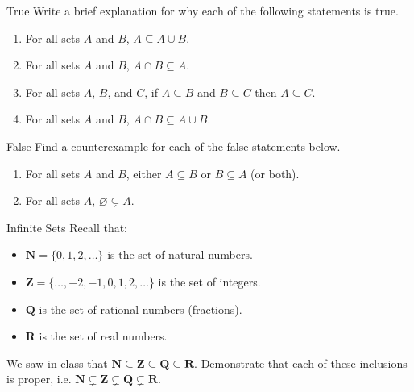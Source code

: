 \documentclass[12pt,letterpaper]{article}
\begin{document}
\begin{problem}{True}
  Write a brief explanation for why each of the following statements is true.

  \begin{enumerate}
    \item For all sets $A$ and $B$, $A \subseteq A \cup B$.
    \item For all sets $A$ and $B$, $A \cap B \subseteq A$.
    \item For all sets $A$, $B$, and $C$, if $A \subseteq B$ and $B \subseteq C$ then $A
    \subseteq C$.
    \item For all sets $A$ and $B$, $A \cap B \subseteq A \cup B$.
  \end{enumerate}
\end{problem}

\begin{problem}{False}
  Find a counterexample for each of the false statements below.

  \begin{enumerate}
    \item For all sets $A$ and $B$, either $A \subseteq B$ or $B \subseteq A$ (or both).
    \item For all sets $A$, $\varnothing \subsetneq A$. 
  \end{enumerate}
\end{problem}

\begin{problem}{Infinite Sets}
  Recall that:

  \begin{itemize}
    \item $\mathbf{N} = \{0, 1, 2, \dots\}$ is the set of natural numbers.
    \item $\mathbf{Z} = \{\dots, -2, -1, 0, 1, 2, \dots\}$ is the set of integers.
    \item $\mathbf{Q}$ is the set of rational numbers (fractions).
    \item $\mathbf{R}$ is the set of real numbers.
  \end{itemize}

  \noindent We saw in class that $\mathbf{N} \subseteq \mathbf{Z} \subseteq \mathbf{Q}
  \subseteq \mathbf{R}$. Demonstrate that each of these inclusions is proper, i.e.
  $\mathbf{N} \subsetneq \mathbf{Z} \subsetneq \mathbf{Q} \subsetneq \mathbf{R}$.

\end{problem}
\end{document}
